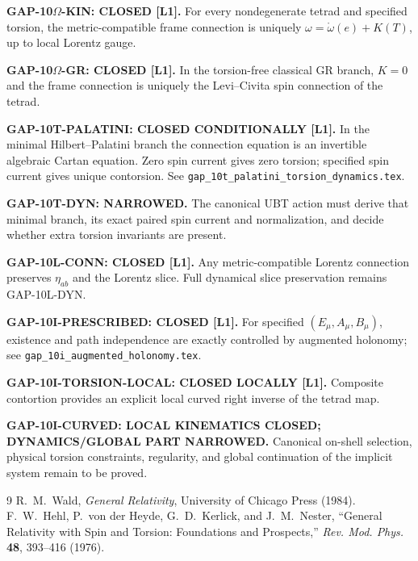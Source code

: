 \documentclass[12pt,a4paper]{article}
\theoremstyle{remark}\newtheorem{remark}[definition]{Remark}
\begin{document}
\begin{tcolorbox}[colback=green!6!white,colframe=green!55!black,title=Defensible status]
\textbf{GAP-10$\Omega$-KIN: CLOSED [L1].}  For every nondegenerate tetrad and
specified torsion, the metric-compatible frame connection is uniquely
$\omega=\mathring\omega(e)+K(T)$, up to local Lorentz gauge.

\medskip
\textbf{GAP-10$\Omega$-GR: CLOSED [L1].}  In the torsion-free classical GR
branch, $K=0$ and the frame connection is uniquely the Levi--Civita spin
connection of the tetrad.

\medskip
\textbf{GAP-10T-PALATINI: CLOSED CONDITIONALLY [L1].}  In the minimal
Hilbert--Palatini branch the connection equation is an invertible algebraic
Cartan equation.  Zero spin current gives zero torsion; specified spin current
gives unique contorsion.  See
\texttt{gap\_10t\_palatini\_torsion\_dynamics.tex}.

\medskip
\textbf{GAP-10T-DYN: NARROWED.}  The canonical UBT action must derive that
minimal branch, its exact paired spin current and normalization, and decide
whether extra torsion invariants are present.

\medskip
\textbf{GAP-10L-CONN: CLOSED [L1].}  Any metric-compatible Lorentz connection
preserves $\eta_{ab}$ and the Lorentz slice.  Full dynamical slice preservation
remains GAP-10L-DYN.

\medskip
\textbf{GAP-10I-PRESCRIBED: CLOSED [L1].}  For specified
$(E_\mu,A_\mu,B_\mu)$, existence and path independence are exactly controlled
by augmented holonomy; see \texttt{gap\_10i\_augmented\_holonomy.tex}.

\medskip
\textbf{GAP-10I-TORSION-LOCAL: CLOSED LOCALLY [L1].}  Composite contortion
provides an explicit local curved right inverse of the tetrad map.

\medskip
\textbf{GAP-10I-CURVED: LOCAL KINEMATICS CLOSED; DYNAMICS/GLOBAL PART
NARROWED.}  Canonical on-shell selection, physical torsion constraints,
regularity, and global continuation of the implicit system remain to be
proved.
\end{tcolorbox}

\begin{thebibliography}{9}
 R.~M.~Wald, \emph{General Relativity}, University of Chicago Press (1984).
 F.~W.~Hehl, P.~von der Heyde, G.~D.~Kerlick, and J.~M.~Nester,
``General Relativity with Spin and Torsion: Foundations and Prospects,''
\emph{Rev. Mod. Phys.} \textbf{48}, 393--416 (1976).
\end{thebibliography}
\end{document}
